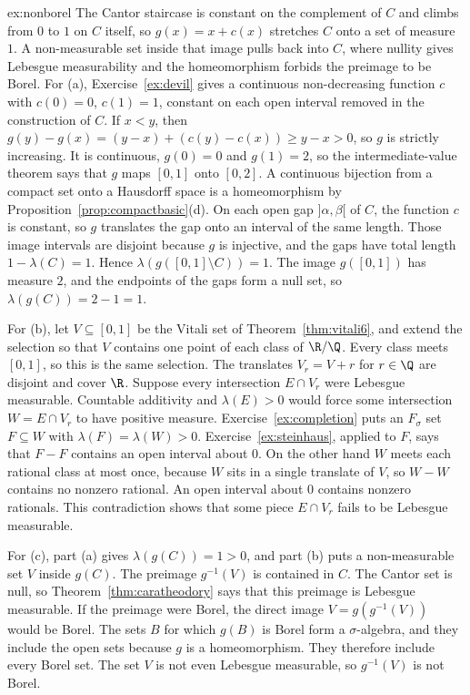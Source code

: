 \begin{solution}{ex:nonborel}
\idea The Cantor staircase is constant on the complement of $C$ and climbs from $0$ to $1$ on $C$ itself, so $g(x)=x+c(x)$ stretches $C$ onto a set of measure $1$.
A non-measurable set inside that image pulls back into $C$, where nullity gives Lebesgue measurability and the homeomorphism forbids the preimage to be Borel.
\writeup For (a), Exercise~\ref{ex:devil} gives a continuous non-decreasing function $c$ with $c(0)=0$, $c(1)=1$, constant on each open interval removed in the construction of $C$.
If $x<y$, then $g(y)-g(x)=(y-x)+(c(y)-c(x))\ge y-x>0$, so $g$ is strictly increasing.
It is continuous, $g(0)=0$ and $g(1)=2$, so the intermediate-value theorem says that $g$ maps $[0,1]$ onto $[0,2]$.
A continuous bijection from a compact set onto a Hausdorff space is a homeomorphism by Proposition~\ref{prop:compactbasic}(d).
On each open gap $]\alpha,\beta[$ of $C$, the function $c$ is constant, so $g$ translates the gap onto an interval of the same length.
Those image intervals are disjoint because $g$ is injective, and the gaps have total length $1-\lambda(C)=1$.
Hence $\lambda(g([0,1]\setminus C))=1$.
The image $g([0,1])$ has measure $2$, and the endpoints of the gaps form a null set, so $\lambda(g(C))=2-1=1$.

For (b), let $V\subseteq[0,1]$ be the Vitali set of Theorem~\ref{thm:vitali6}, and extend the selection so that $V$ contains one point of each class of $\R/\Q$.
Every class meets $[0,1]$, so this is the same selection.
The translates $V_r=V+r$ for $r\in\Q$ are disjoint and cover $\R$.
Suppose every intersection $E\cap V_r$ were Lebesgue measurable.
Countable additivity and $\lambda(E)>0$ would force some intersection $W=E\cap V_r$ to have positive measure.
Exercise~\ref{ex:completion} puts an $F_\sigma$ set $F\subseteq W$ with $\lambda(F)=\lambda(W)>0$.
Exercise~\ref{ex:steinhaus}, applied to $F$, says that $F-F$ contains an open interval about $0$.
On the other hand $W$ meets each rational class at most once, because $W$ sits in a single translate of $V$, so $W-W$ contains no nonzero rational.
An open interval about $0$ contains nonzero rationals.
This contradiction shows that some piece $E\cap V_r$ fails to be Lebesgue measurable.

For (c), part (a) gives $\lambda(g(C))=1>0$, and part (b) puts a non-measurable set $V$ inside $g(C)$.
The preimage $g^{-1}(V)$ is contained in $C$.
The Cantor set is null, so Theorem~\ref{thm:caratheodory} says that this preimage is Lebesgue measurable.
If the preimage were Borel, the direct image $V=g(g^{-1}(V))$ would be Borel.
The sets $B$ for which $g(B)$ is Borel form a $\sigma$-algebra, and they include the open sets because $g$ is a homeomorphism.
They therefore include every Borel set.
The set $V$ is not even Lebesgue measurable, so $g^{-1}(V)$ is not Borel.
\end{solution}

